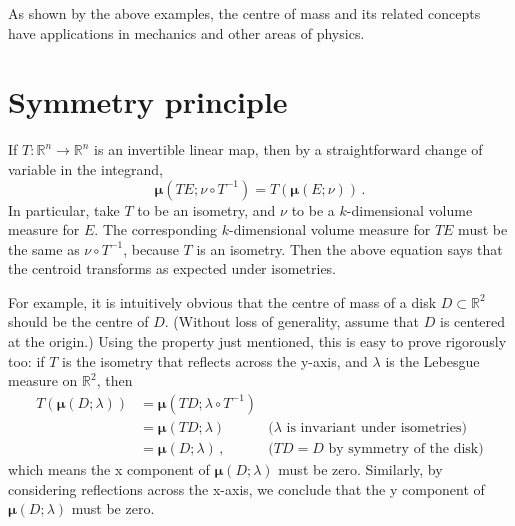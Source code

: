 \documentclass[12pt]{article}
\newcommand{\real}{\mathbb{R}}
\newcommand{\vmu}{\boldsymbol{\mu}}
\begin{document}
As shown by the above examples, the centre of mass and its related concepts 
have applications in mechanics and other areas of physics.

\section*{Symmetry principle}
If $T \colon \real^n \to \real^n$ is an invertible linear map, then by a straightforward change of variable
in the integrand, 
\[
\vmu(TE; \nu \circ T^{-1}) = T(\vmu (E; \nu) )\,.
\]
In particular, take $T$ to be an isometry, and $\nu$ to be a $k$-dimensional volume measure for $E$.
The corresponding $k$-dimensional volume measure for $TE$
must be the same as $\nu \circ T^{-1}$, because $T$ is an isometry.
Then the above equation says that 
the centroid transforms as expected under isometries. 

For example, it is intuitively obvious that the centre of mass of a disk $D \subset \real^2$ should be the centre of $D$.  (Without loss of generality, assume that $D$ is centered at the origin.)
Using the property just mentioned, this is easy to prove rigorously too:
if $T$ is the isometry that reflects across the y-axis, and $\lambda$ is the Lebesgue measure on $\real^2$,
then 
\begin{align*}
T(\vmu (D; \lambda)) &= \vmu(TD; \lambda \circ T^{-1}) \\
&= \vmu(TD; \lambda) &\text{($\lambda$ is invariant under isometries)} \\
&= \vmu(D; \lambda)\,, & \text{($TD = D$ by symmetry of the disk)}
\end{align*}
which means the x component of $\vmu(D; \lambda)$
must be zero.  Similarly, by considering reflections across the x-axis, we conclude
that the y component of $\vmu(D; \lambda)$ must be zero.
\end{document}

